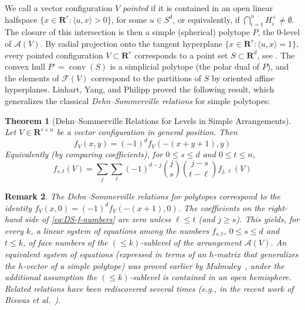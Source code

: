 \documentclass[11pt]{article}
\newtheorem{theorem}{Theorem}
\newtheorem{remark}[theorem]{Remark}
\newcommand{\arr}{\mathcal{A}}
\DeclareMathOperator{\conv}{conv}
\renewcommand{\leq}{\leqslant}
\renewcommand{\geq}{\geqslant}
\newcommand{\R}{\mathbf{R}}
\newcommand{\uli}[1]{\textcolor{blue}{\textsl{Uli: #1}}}
\begin{document}
%
We call a vector configuration $V$ \emph{pointed} if it is contained in an open linear halfspace $\{x\in \R^r\colon \langle u,x\rangle >0\}$, for some $u\in S^d$, or equivalently, if %
$\bigcap_{i=1}^n H^+_i\neq \emptyset$. %
The closure of this intersection is then a simple (spherical) polytope $P$, the $0$-level of $\arr(V)$.
By radial projection onto the tangent hyperplane $\{x\in \R^r\colon \langle u,x\rangle = 1\}$, every pointed configuration $V\subset \R^r$ corresponds to a point set $S\subset \R^d$, see \cite[Sec.~5.6]{Matousek:2002aa}. %
The convex hull $P^\circ=\conv(S)$ is a simplicial polytope (the polar dual of $P$), and the elements of $\mathcal{F}(V)$ correspond to the partitions of $S$ by oriented affine hyperplanes. 
%
%
Linhart, Yang, and Philipp \cite{Linhart:2000aa} proved the following result, which generalizes the classical \emph{Dehn--Sommerville relations} for simple polytopes:
\begin{theorem}[Dehn--Sommerville Relations for Levels in Simple Arrangements]
\label{thm:DS-levels}
Let $V \in \R^{r\times n}$ be a vector configuration in general position. Then
\begin{equation}
\label{eq:DS-f-poly}
f_V(x,y)=(-1)^d f_V(-(x+y+1),y)
\end{equation}
Equivalently (by comparing coefficients), for $0\leq s\leq d$ and $0\leq t\leq n$,
\begin{equation}
\label{eq:DS-f-numbers}
f_{s,t}(V)=\sum_{j} \sum_{\ell} (-1)^{d-j} \binom{j}{s} \binom{j-s}{t-\ell} f_{j,\ell}(V) 
\end{equation}
\end{theorem}
\begin{remark}
The Dehn--Sommerville relations for polytopes correspond to the identity $f_V(x,0)=(-1)^d f_V(-(x+1),0)$. The coefficients on the right-hand side of \eqref{eq:DS-f-numbers} are zero unless $\ell \leq t$ (and $j\geq s$). This yields, for every $k$, a linear system of equations among the numbers $f_{s,t}$, $0\leq s\leq d$ and $t\leq k$, of face numbers of the  \emph{$(\leq k)$-sublevel} of the arrangement $\arr(V)$. An equivalent system of equations (expressed in terms of an \emph{$h$-matrix} that generalizes the $h$-vector of a simple polytope) was proved earlier by Mulmuley~\cite{Mulmuley:1993aa}, under the additional assumption the $(\leq k)$-sublevel is contained in an open hemisphere. %
Related relations have been rediscovered several times (e.g., in the recent work of Biswas et al.~\cite{Biswas:2024aa}).
\end{remark}
\end{document}
